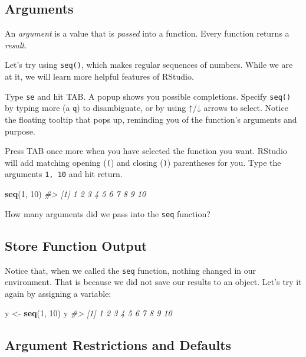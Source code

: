 \documentclass[]{book}
\newenvironment{Shaded}{\begin{snugshade}}{\end{snugshade}}
\newcommand{\KeywordTok}[1]{\textcolor[rgb]{0.13,0.29,0.53}{\textbf{#1}}}
\newcommand{\DecValTok}[1]{\textcolor[rgb]{0.00,0.00,0.81}{#1}}
\newcommand{\StringTok}[1]{\textcolor[rgb]{0.31,0.60,0.02}{#1}}
\newcommand{\CommentTok}[1]{\textcolor[rgb]{0.56,0.35,0.01}{\textit{#1}}}
\newcommand{\NormalTok}[1]{#1}
\begin{document}
\subsection{Arguments}\label{arguments}

An \emph{argument} is a value that is \emph{passed} into a function.
Every function returns a \emph{result}.

Let's try using \texttt{seq()}, which makes regular sequences of
numbers. While we are at it, we will learn more helpful features of
RStudio.

Type \texttt{se} and hit TAB. A popup shows you possible completions.
Specify \texttt{seq()} by typing more (a \texttt{q}) to disambiguate, or
by using ↑/↓ arrows to select. Notice the floating tooltip that pops up,
reminding you of the function's arguments and purpose.

Press TAB once more when you have selected the function you want.
RStudio will add matching opening (\texttt{(}) and closing (\texttt{)})
parentheses for you. Type the arguments \texttt{1,\ 10} and hit return.

\begin{Shaded}
\begin{Highlighting}[]
\KeywordTok{seq}\NormalTok{(}\DecValTok{1}\NormalTok{, }\DecValTok{10}\NormalTok{)}
\CommentTok{#>  [1]  1  2  3  4  5  6  7  8  9 10}
\end{Highlighting}
\end{Shaded}

How many arguments did we pass into the \texttt{seq} function?

\subsection{Store Function Output}\label{store-function-output}

Notice that, when we called the \texttt{seq} function, nothing changed
in our environment. That is because we did not save our results to an
object. Let's try it again by assigning a variable:

\begin{Shaded}
\begin{Highlighting}[]
\NormalTok{y <-}\StringTok{ }\KeywordTok{seq}\NormalTok{(}\DecValTok{1}\NormalTok{, }\DecValTok{10}\NormalTok{)}
\NormalTok{y}
\CommentTok{#>  [1]  1  2  3  4  5  6  7  8  9 10}
\end{Highlighting}
\end{Shaded}

\subsection{Argument Restrictions and
Defaults}\label{argument-restrictions-and-defaults}
\end{document}

